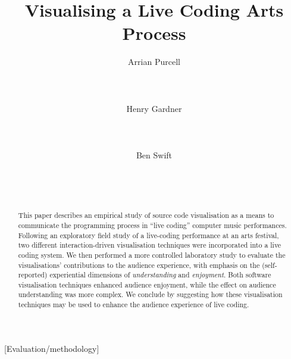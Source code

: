 \documentclass{sig-alternate}
\begin{document}

\title{Visualising a Live Coding Arts Process}

\author{
\alignauthor Arrian Purcell\\
       \\
       \\
       \\
\alignauthor Henry Gardner\\
       \\
       \\
       \\
\alignauthor Ben Swift\\
       \\
       \\
       \\
}

\maketitle
\begin{abstract}
  This paper describes an empirical study of source code visualisation
  as a means to communicate the programming process in ``live coding''
  computer music performances. Following an exploratory field study of
  a live-coding performance at an arts festival, two different
  interaction-driven visualisation techniques were incorporated into a
  live coding system. We then performed a more controlled laboratory
  study to evaluate the visualisations' contributions to the audience
  experience, with emphasis on the (self-reported) experiential
  dimensions of \emph{understanding} and \emph{enjoyment}. Both
  software visualisation techniques enhanced audience enjoyment, while
  the effect on audience understanding was more complex. We conclude
  by suggesting how these visualisation techniques may be used to
  enhance the audience experience of live coding.
\end{abstract}

[Evaluation/methodology]
\end{document}
